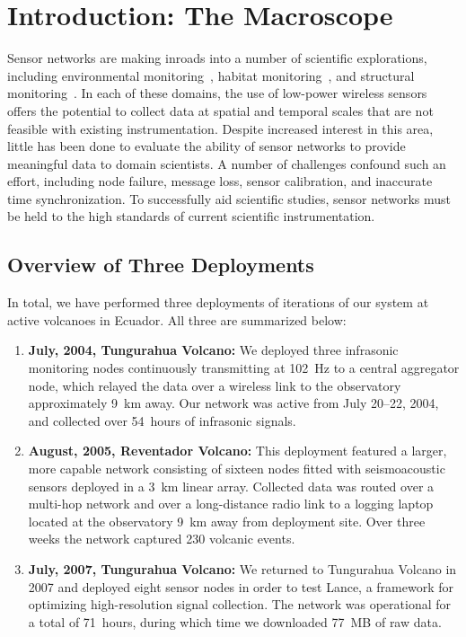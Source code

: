 \chapter{Introduction: The Macroscope} 
\label{chap-introduction}


Sensor networks are making inroads into a number of scientific explorations,
including environmental monitoring~\cite{rope-emnets05,berkeley-redwoods},
habitat monitoring~\cite{cerpa-habitat,mainwaring-habitat,gdi-sensys04}, and
structural monitoring~\cite{ggb-monitoring,netshm-emnets05,wisan}.  In each
of these domains, the use of low-power wireless sensors offers the potential
to collect data at spatial and temporal scales that are not feasible with
existing instrumentation.  Despite increased interest in this area, little
has been done to evaluate the ability of sensor networks to provide
meaningful data to domain scientists. A number of challenges confound such an
effort, including node failure, message loss, sensor calibration, and
inaccurate time synchronization. To successfully aid scientific studies,
sensor networks must be held to the high standards of current scientific
instrumentation.

\section{Overview of Three Deployments}

In total, we have performed three deployments of iterations of our system at
active volcanoes in Ecuador. All three are summarized below:

\begin{enumerate}

\item \textbf{July, 2004, Tungurahua Volcano:} We deployed three infrasonic
monitoring nodes continuously transmitting at 102~Hz to a central aggregator
node, which relayed the data over a wireless link to the observatory
approximately 9~km away.  Our network was active from July 20--22, 2004, and
collected over 54~hours of infrasonic signals.

\item \textbf{August, 2005, Reventador Volcano:} This deployment featured a larger,
more capable network consisting of sixteen nodes fitted with seismoacoustic
sensors deployed in a 3~km linear array.  Collected data was routed over a
multi-hop network and over a long-distance radio link to a logging laptop
located at the observatory 9~km away from deployment site.  Over three weeks
the network captured 230 volcanic events.

\item \textbf{July, 2007, Tungurahua Volcano:} We returned to Tungurahua Volcano in
2007 and deployed eight sensor nodes in order to test Lance, a framework for
optimizing high-resolution signal collection. The network was operational for
a total of 71~hours, during which time we downloaded 77~MB of raw data.

\end{enumerate}


